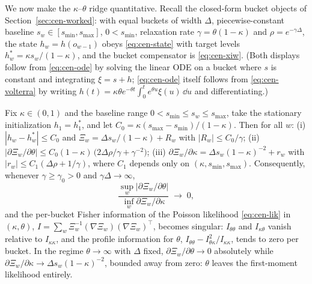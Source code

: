 We now make the $\kappa$--$\theta$ ridge quantitative. Recall the closed-form bucket objects of
Section~\ref{sec:cen-worked}: with equal buckets of width $\Delta$, piecewise-constant baseline $s_w
\in [s_{\min}, s_{\max}]$, $0 < s_{\min}$, relaxation rate $\gamma = \theta(1 - \kappa)$ and $\rho =
e^{-\gamma\Delta}$, the state $h_w = h(o_{w-1})$ obeys \eqref{eq:cen-state} with target levels
$h_w^\ast = \kappa s_w/(1-\kappa)$, and the bucket compensator is \eqref{eq:cen-xiw}. (Both displays
follow from \eqref{eq:cen-ode} by solving the linear ODE on a bucket where $s$ is constant and
integrating $\xi = s + h$; \eqref{eq:cen-ode} itself follows from \eqref{eq:cen-volterra} by writing
$h(t) = \kappa\theta e^{-\theta t}\int_0^t e^{\theta u} \xi(u)\, \dd u$ and differentiating.)

\begin{proposition}
\label{prop:app-ridge}
Fix $\kappa \in (0,1)$ and the baseline range $0 < s_{\min} \le s_w \le s_{\max}$, take the
stationary initialization $h_1 = h_1^\ast$, and let $C_0 = \kappa(s_{\max} - s_{\min})/(1-\kappa)$.
Then for all $w$: (i) $|h_w - h_w^\ast| \le C_0$ and $\Xi_w = \Delta s_w/(1-\kappa) + R_w$ with
$|R_w| \le C_0/\gamma$; (ii) $\big|\partial \Xi_w / \partial\theta\big| \le C_0 (1-\kappa)\, \big(
2\Delta\rho/\gamma + \gamma^{-2} \big)$; (iii) $\partial \Xi_w / \partial\kappa = \Delta s_w
(1-\kappa)^{-2} + r_w$ with $|r_w| \le C_1 (\Delta \rho + 1/\gamma)$, where $C_1$ depends only on
$(\kappa, s_{\min}, s_{\max})$. Consequently, whenever $\gamma \ge \gamma_0 > 0$ and $\gamma\Delta
\to \infty$,
\[
\frac{\sup_w |\partial \Xi_w/\partial\theta|}{\inf_w \partial \Xi_w/\partial\kappa}
\;\longrightarrow\; 0,
\]
and the per-bucket Fisher information of the Poisson likelihood \eqref{eq:cen-lik} in $(\kappa,
\theta)$, $I = \sum_w \Xi_w^{-1} (\nabla \Xi_w)(\nabla \Xi_w)^\top$, becomes singular:
$I_{\theta\theta}$ and $I_{\kappa\theta}$ vanish relative to $I_{\kappa\kappa}$, and the profile
information for $\theta$, $I_{\theta\theta} - I_{\theta\kappa}^2/I_{\kappa\kappa}$, tends to zero
per bucket. In the regime $\theta \to \infty$ with $\Delta$ fixed, $\partial \Xi_w/\partial\theta
\to 0$ absolutely while $\partial \Xi_w/\partial\kappa \to \Delta s_w (1-\kappa)^{-2}$, bounded away
from zero: $\theta$ leaves the first-moment likelihood entirely.
\end{proposition}

